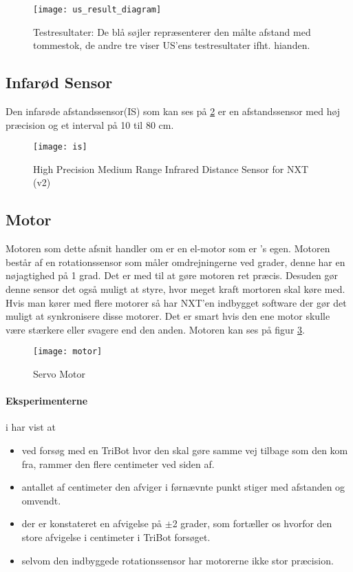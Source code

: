 \begin{figure}[h]
\centering
\texttt{[image: us\_result\_diagram]}
\caption{Testresultater: De blå søjler repræsenterer den målte afstand med tommestok, de andre tre viser US'ens testresultater ifht. hianden.}
\label{sensor:ultrasonic_resultat_diagram}
\end{figure}


\subsection{Infarød Sensor}
Den infarøde afstandssensor(IS) som kan ses på \ref{sensor:infraroed_sensor} er en afstandssensor med høj præcision og et interval på 10 til 80 cm.

\begin{figure}[h]
\centering
\texttt{[image: is]} 	
\caption{High Precision Medium Range Infrared Distance Sensor for NXT (v2)}
\label{sensor:infraroed_sensor}
\end{figure}

\subsection{Motor}
Motoren som dette afsnit handler om er en el-motor som er \lego's egen.
Motoren består af en rotationssensor som måler omdrejningerne ved grader, denne har en nøjagtighed på 1 grad. Det er med til at gøre motoren ret præcis. 
Desuden gør denne sensor det også muligt at styre, hvor meget kraft mortoren skal køre med.
Hvis man kører med flere motorer så har NXT'en indbygget software der gør det muligt at synkronisere disse motorer.
Det er smart hvis den ene motor skulle være stærkere eller svagere end den anden.\cite{tikNXT}
Motoren kan ses på figur \ref{sensor:motor_sensor}.
\\

\begin{figure}[h]
\centering
\texttt{[image: motor]} 	
\caption{\legoms Servo Motor}
\label{sensor:motor_sensor}
\end{figure}

\paragraph{Eksperimenterne} i \cite{tikNXT} har vist at
\begin{itemize}
\item ved forsøg med en TriBot hvor den skal gøre samme vej tilbage som den kom fra, rammer den flere centimeter ved siden af.
\item antallet af centimeter den afviger i førnævnte punkt stiger med afstanden og omvendt.
\item der er konstateret en afvigelse på $\pm$2 grader, som fortæller os hvorfor den store afvigelse i centimeter i TriBot forsøget.
\item selvom den indbyggede rotationssensor har motorerne ikke stor præcision.
\end{itemize}

